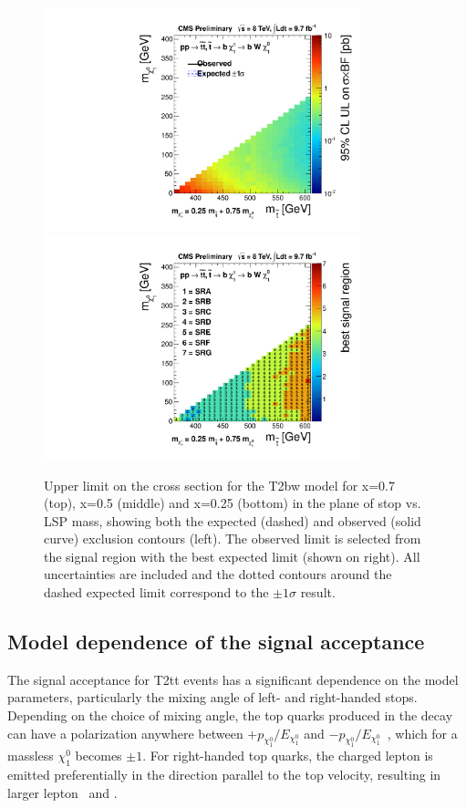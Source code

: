 \begin{figure}[hbt]
\begin{center}
       \includegraphics[height=6.5cm]{plots/combinePlots_T2bw_x25.pdf}%
       \includegraphics[height=6.5cm]{plots/combinePlots_T2bw_x25_bestSignalRegion.pdf}
    \caption{Upper limit on the cross section for the T2bw model for
      x=0.7 (top), x=0.5 (middle) and x=0.25 (bottom) in
      the plane of stop vs. LSP mass, showing
      both the expected (dashed) and observed (solid curve) exclusion
      contours (left). The observed
      limit is selected from the signal region with the best expected
      limit (shown on right). All uncertainties are included and the
      dotted contours around the dashed expected limit correspond to
      the $\pm 1\sigma$ result.}
\label{fig:comblimitT2bw}
      \end{center}
\end{figure}

\clearpage



\subsection{Model dependence of the signal acceptance}
\label{sec:modeldependence}

The signal acceptance for T2tt events has a significant dependence on the model parameters, particularly the mixing angle of left- and right-handed stops.
Depending on the choice of mixing angle, the top quarks produced in the decay can have a polarization anywhere between
$+p_{\chi_1^0}/E_{\chi_1^0}$ and $-p_{\chi_1^0}/E_{\chi_1^0}$~\cite{0811.1024}, which for a massless $\chi_1^0$ becomes $\pm 1$.
For right-handed top quarks, the charged lepton is emitted preferentially in the direction parallel to the top velocity, resulting in larger lepton \pt\ and \mt.

